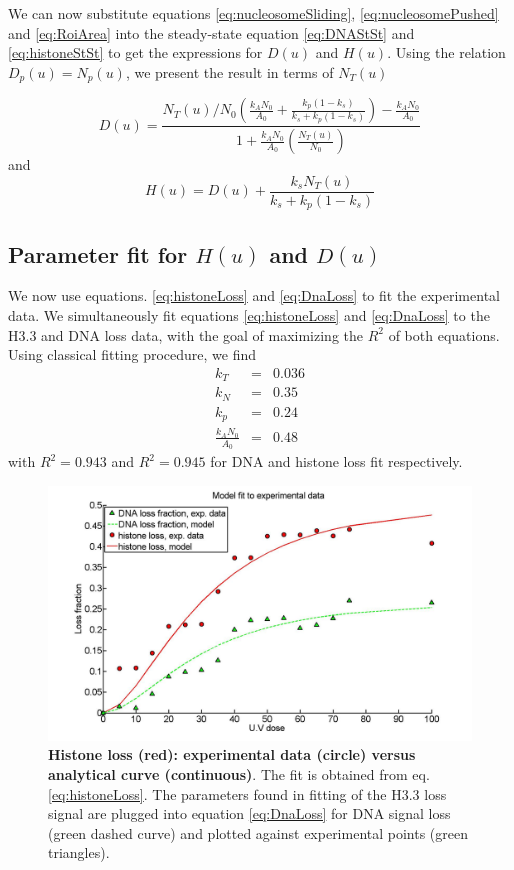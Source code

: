 \documentclass[12pt]{article}
\begin{document}
We can now substitute equations \ref{eq:nucleosomeSliding}, \ref{eq:nucleosomePushed} and \ref{eq:RoiArea} into the steady-state equation \ref{eq:DNAStSt} and \ref{eq:histoneStSt} to get the expressions for $D(u)$ and $H(u)$. Using the relation $D_p(u)=N_p(u)$, we present the result in terms of $N_T(u)$


\begin{equation}
\label{eq:DnaLoss}
D(u) = \frac{N_T(u)/N_0\left(\frac{k_AN_0}{A_0}+\frac{k_p(1-k_s)}{k_s+k_p(1-k_s)}\right)-\frac{k_AN_0}{A_0}}{1+\frac{k_AN_0}{A_0}\left(\frac{N_T(u)}{N_0}\right)}
\end{equation}
and 
\begin{equation}\label{eq:histoneLoss}
H(u) = D(u)+\frac{k_sN_T(u)}{k_s+k_p(1-k_s)}
\end{equation}

\subsection{Parameter fit for $H(u)$ and $D(u)$ }\label{subsection:parameterFit}
We now use equations. \ref{eq:histoneLoss} and \ref{eq:DnaLoss} to fit the experimental data. We simultaneously fit equations \ref{eq:histoneLoss} and \ref{eq:DnaLoss} to the H3.3 and DNA loss data, with the goal of maximizing the $R^2$ of both equations. 
Using classical fitting procedure, we find 
\begin{eqnarray*}
k_T &=&  0.036\\
k_N &=&  0.35\\
k_p &=&  0.24\\
\frac{k_AN_0}{A_0} &=&  0.48 
\end{eqnarray*}
with $R^2=0.943$ and $R^2=0.945$ for DNA and histone loss fit respectively.

\begin{figure}[H]
\centering
\includegraphics[width=0.6\linewidth, height=0.3\textheight]{histoneAndDnaVsUvDoseModelFit}
\caption{\textbf{Histone loss (red): experimental data (circle) versus analytical curve (continuous)}. The fit is obtained from  eq. \ref{eq:histoneLoss}. The parameters found in fitting of the H3.3 loss signal are plugged into equation \ref{eq:DnaLoss} for DNA signal loss (green dashed curve) and plotted against experimental points (green triangles).}
\label{fig:histoneAndDnaVsUvDoseModelFit}
\end{figure}
\end{document}
